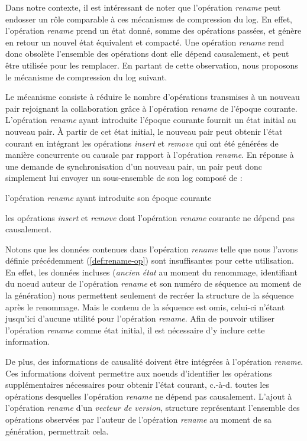 \documentclass[12pt]{thesul}
\newcommand{\ie}{c.-à-d. }
\begin{document}
Dans notre contexte, il est intéressant de noter que l'opération \emph{rename} peut endosser un rôle comparable à ces mécanismes de compression du log.
En effet, l'opération \emph{rename} prend un état donné, somme des opérations passées, et génère en retour un nouvel état équivalent et compacté.
Une opération \emph{rename} rend donc obsolète l'ensemble des opérations dont elle dépend causalement, et peut être utilisée pour les remplacer.
En partant de cette observation, nous proposons le mécanisme de compression du log suivant.

Le mécanisme consiste à réduire le nombre d'opérations transmises à un nouveau pair rejoignant la collaboration grâce à l'opération \emph{rename} de l'époque courante.
L'opération \emph{rename} ayant introduite l'époque courante fournit un état initial au nouveau pair.
À partir de cet état initial, le nouveau pair peut obtenir l'état courant en intégrant les opérations \emph{insert} et \emph{remove} qui ont été générées de manière concurrente ou causale par rapport à l'opération \emph{rename}.
En réponse à une demande de synchronisation d'un nouveau pair, un pair peut donc simplement lui envoyer un sous-ensemble de son log composé de :
\begin{enumerate*}[label=(\roman*)]
  \item l'opération \emph{rename} ayant introduite son époque courante
  \item les opérations \emph{insert} et \emph{remove} dont l'opération \emph{rename} courante ne dépend pas causalement.
\end{enumerate*}

Notons que les données contenues dans l'opération \emph{rename} telle que nous l'avons définie précédemment (\autoref{def:rename-op}) sont insuffisantes pour cette utilisation.
En effet, les données incluses (\emph{ancien état} au moment du renommage, identifiant du noeud auteur de l'opération \emph{rename} et son numéro de séquence au moment de la génération) nous permettent seulement de recréer la structure de la séquence après le renommage.
Mais le contenu de la séquence est omis, celui-ci n'étant jusqu'ici d'aucune utilité pour l'opération \emph{rename}.
Afin de pouvoir utiliser l'opération \emph{rename} comme état initial, il est nécessaire d'y inclure cette information.

De plus, des informations de causalité doivent être intégrées à l'opération \emph{rename}.
Ces informations doivent permettre aux noeuds d'identifier les opérations supplémentaires nécessaires pour obtenir l'état courant, \ie toutes les opérations desquelles l'opération \emph{rename} ne dépend pas causalement.
L'ajout à l'opération \emph{rename} d'un \emph{vecteur de version}, structure représentant l'ensemble des opérations observées par l'auteur de l'opération \emph{rename} au moment de sa génération, permettrait cela.
\end{document}
